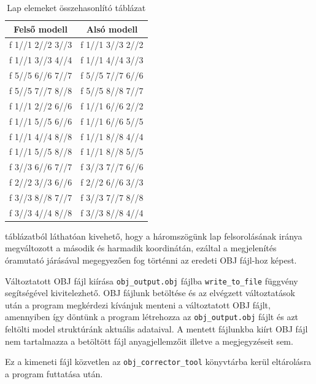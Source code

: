 \newpage

\begin{table}[h]
\centering
\caption{Lap elemeket összehasonlító táblázat}
\bigskip
\begin{tabular}{|c|c|}
Felső modell& Alsó modell \\
\hline
f  1//1 2//2 3//3 & f  1//1 3//3 2//2 \\
f  1//1 3//3 4//4 & f  1//1 4//4 3//3 \\
f  5//5 6//6 7//7 & f  5//5 7//7 6//6 \\
f  5//5 7//7 8//8 & f  5//5 8//8 7//7 \\ 
f  1//1 2//2 6//6 & f  1//1 6//6 2//2 \\
f  1//1 5//5 6//6 & f  1//1 6//6 5//5 \\
f  1//1 4//4 8//8 & f  1//1 8//8 4//4 \\
f  1//1 5//5 8//8 & f  1//1 8//8 5//5 \\
f  3//3 6//6 7//7 & f  3//3 7//7 6//6 \\
f  2//2 3//3 6//6 & f  2//2 6//6 3//3 \\
f  3//3 8//8 7//7 & f  3//3 7//7 8//8 \\
f  3//3 4//4 8//8 & f  3//3 8//8 4//4 \\
\hline
\end{tabular}
\label{fig:bej3}
\end{table}
\bigskip 

 táblázatból láthatóan kivehető, hogy a háromszögünk lap felsorolásának iránya megváltozott a második és harmadik koordinátán, ezáltal a megjelenítés óramutató járásával megegyezően fog történni az eredeti OBJ fájl-hoz képest.

Változtatott OBJ fájl kiírása \texttt{obj\_output.obj} fájlba \texttt{write\_to\_file} függvény segítségével kivitelezhető. OBJ fájlunk betöltése és az elvégzett változtatások után a program megkérdezi kívánjuk menteni a változtatott OBJ fájlt, amennyiben így döntünk a program létrehozza az \texttt{obj\_output.obj} fájlt és azt feltölti model struktúránk aktuális adataival. A mentett fájlunkba kiírt OBJ fájl nem tartalmazza a betöltött fájl anyagjellemzőit illetve a megjegyzéseit sem.
\bigskip
{}
\bigskip

Ez a kimeneti fájl közvetlen az \texttt{obj\_corrector\_tool} könyvtárba kerül eltárolásra a program futtatása után.







